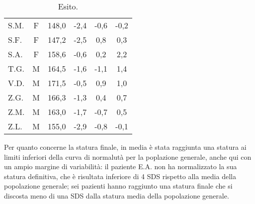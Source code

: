 \begin{table}[!h]
\begin{center}
\begin{tabular}{lccccc}
S.M.	& F & 148,0 & -2,4  & -0,6  & -0,2    \\
S.F.	& F & 147,2 & -2,5  & 0,8   & 0,3     \\
S.A.	& F & 158,6 & -0,6  & 0,2   & 2,2     \\
T.G.    & M & 164,5 & -1,6  & -1,1  & 1,4    \\
V.D.	& M & 171,5 & -0,5  & 0,9   & 1,0     \\
Z.G.	& M & 166,3 & -1,3  & 0,4   & 0,7   \\
Z.M.	& M & 163,0 & -1,7  & -0,7  & 0,5     \\
Z.L.	& M & 155,0 & -2,9  & -0,8  & -0,1    \\
\bottomrule
\end{tabular}
\end{center}
\caption{Esito.}
\label{tab:Esito}
\end{table}

Per quanto concerne la statura finale, in media è stata raggiunta una statura ai limiti inferiori della curva di normalutà per la poplazione generale, anche qui con un ampio margine di variabilità: il paziente E.A. non ha normalizzato la sua statura definitiva, che è risultata inferiore di 4 SDS rispetto alla media della popolazione generale; sei pazienti hanno raggiunto una statura finale che si discosta meno di una SDS dalla statura media della popolazione generale. 

